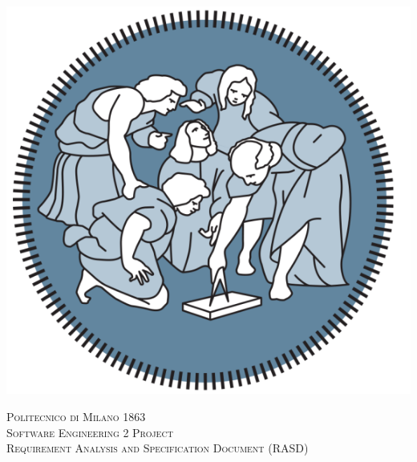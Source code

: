




\begin{titlepage} %
	\newcommand{\HRule}{\rule{\linewidth}{0.5mm}} %
	
	\center %
	

	\begin{center} \includegraphics[scale=0.5]{Images/PolimiLogo1} \end{center}
	\textsc{\LARGE Politecnico di Milano 1863}\\[1.5cm] 
	
	\textsc{\Large Software Engineering 2 Project }\\[0.5cm] 
	
	\textsc{\large Requirement Analysis and Specification Document (RASD)}\\[0.5cm] 
	
	

\end{titlepage}
